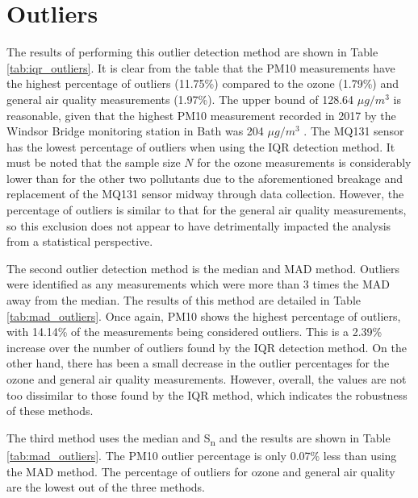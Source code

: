 \documentclass[11pt,twosided,a4paper]{report}
\begin{document}
\chapter{Outliers} \label{appendix:outliers}

The results of performing this outlier detection method are shown in Table \ref{tab:iqr_outliers}. It is clear from the table that the PM10 measurements have the highest percentage of outliers (11.75\%) compared to the ozone (1.79\%) and general air quality measurements (1.97\%). The upper bound of 128.64 $\mu g/m^3$ is reasonable, given that the highest PM10 measurement recorded in 2017 by the Windsor Bridge monitoring station in Bath was 204 $\mu g/m^3$ \citep{courthold2018max}. The MQ131 sensor has the lowest percentage of outliers when using the IQR detection method. It must be noted that the sample size $N$ for the ozone measurements is considerably lower than for the other two pollutants due to the aforementioned breakage and replacement of the MQ131 sensor midway through data collection. However, the percentage of outliers is similar to that for the general air quality measurements, so this exclusion does not appear to have detrimentally impacted the analysis from a statistical perspective.

The second outlier detection method is the median and MAD method. Outliers were identified as any measurements which were more than 3 times the MAD away from the median. The results of this method are detailed in Table \ref{tab:mad_outliers}. Once again, PM10 shows the highest percentage of outliers, with 14.14\% of the measurements being considered outliers. This is a 2.39\% increase over the number of outliers found by the IQR detection method. On the other hand, there has been a small decrease in the outlier percentages for the ozone and general air quality measurements. However, overall, the values are not too dissimilar to those found by the IQR method, which indicates the robustness of these methods.

The third method uses the median and S\textsubscript{n} and the results are shown in Table \ref{tab:mad_outliers}. The PM10 outlier percentage is only 0.07\% less than using the MAD method. The percentage of outliers for ozone and general air quality are the lowest out of the three methods.
\end{document}
